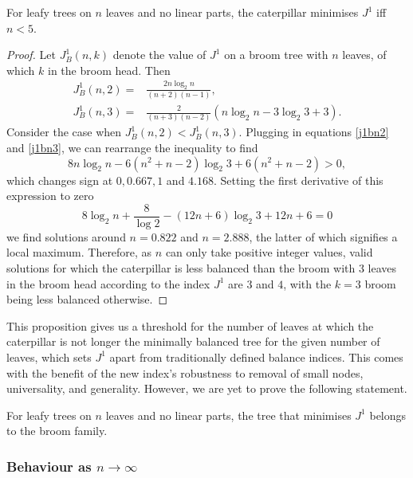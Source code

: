 \begin{proposition}\label{cat_prop}
    For leafy trees on $n$ leaves and no linear parts, the caterpillar minimises $J^1$ iff $n<5$.
\end{proposition}
\begin{proof}
    Let $J^1_B(n,k)$ denote the value of $J^1$ on a broom tree with $n$ leaves, of which $k$ in the broom head. Then
    \begin{align}
        J^1_B(n,2) = & \frac{2n\log_2n}{(n+2)(n-1)}, \label{j1bn2}\\
        J^1_B(n,3) = & \frac{2}{(n+3)(n-2)}(n\log_2n - 3\log_2 3 + 3).\label{j1bn3}
    \end{align}
    Consider the case when $J^1_B(n,2) < J^1_B(n,3)$. Plugging in equations \eqref{j1bn2} and \eqref{j1bn3}, we can rearrange the inequality to find
    \begin{equation}
        8n\log_2n - 6(n^2+n-2)\log_2 3 + 6(n^2+n-2) > 0,
    \end{equation}
    which changes sign at $0, 0.667, 1$ and $4.168$. Setting the first derivative of this expression to zero 
    \begin{equation*}
        8\log_2n+\frac{8}{\log 2}-(12n+6)\log_2 3 + 12n + 6 = 0
    \end{equation*}
    we find solutions around $n=0.822$ and $n=2.888$, the latter of which signifies a local maximum. Therefore, as $n$ can only take positive integer values, valid solutions for which the caterpillar is less balanced than the broom with $3$ leaves in the broom head according to the index $J^1$ are $3$ and $4$, with the $k=3$ broom being less balanced otherwise.
\end{proof}

This proposition gives us a threshold for the number of leaves at which the caterpillar is not longer the minimally balanced tree for the given number of leaves, which sets $J^1$ apart from traditionally defined balance indices. This comes with the benefit of the new index's robustness to removal of small nodes, universality, and generality. However, we are yet to prove the following statement.

\begin{conjecture}\label{conj}
    For leafy trees on $n$ leaves and no linear parts, the tree that minimises $J^1$ belongs to the broom family.
\end{conjecture}

\subsubsection{Behaviour as $n\to\infty$}
    
